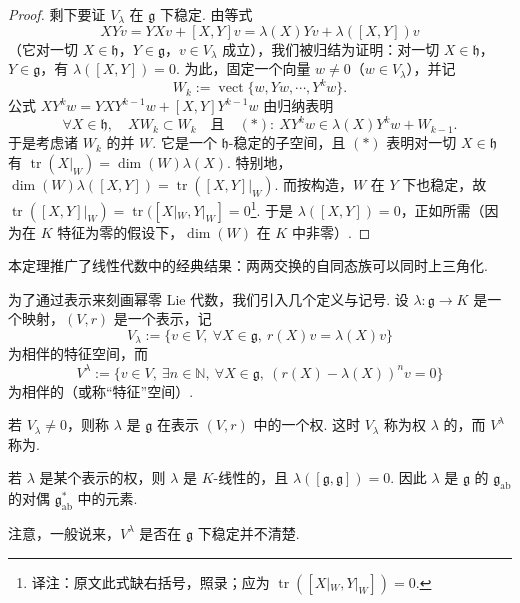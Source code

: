 \begin{numpara}[借助表示论的刻画]
\begin{proof}
剩下要证 $V_{\lambda}$ 在 $\mathfrak{g}$ 下稳定. 由等式
\[XYv = YXv + [X, Y]v = \lambda(X)Yv + \lambda([X, Y])v\]
（它对一切 $X \in \mathfrak{h}$，$Y \in \mathfrak{g}$，$v \in V_{\lambda}$ 成立），我们被归结为证明：对一切 $X \in \mathfrak{h}$，$Y \in \mathfrak{g}$，有 $\lambda([X, Y]) = 0$. 为此，固定一个向量 $w \neq 0$（$w \in V_{\lambda}$），并记
\[W_k := \operatorname{vect}\{w, Yw, \cdots, Y^k w\}.\]
公式 $XY^k w = YXY^{k-1}w + [X, Y]Y^{k-1}w$ 由归纳表明
\[\forall X \in \mathfrak{h},\quad XW_k \subset W_k\quad\text{且}\quad (\ast):\ XY^k w \in \lambda(X)Y^k w + W_{k-1}.\]
于是考虑诸 $W_k$ 的并 $W$. 它是一个 $\mathfrak{h}$-稳定的子空间，且 $(\ast)$ 表明对一切 $X \in \mathfrak{h}$ 有 $\operatorname{tr}(X|_W) = \dim(W)\lambda(X)$. 特别地，$\dim(W)\lambda([X, Y]) = \operatorname{tr}([X, Y]|_W)$. 而按构造，$W$ 在 $Y$ 下也稳定，故 $\operatorname{tr}([X, Y]|_W) = \operatorname{tr}([X|_W, Y|_W] = 0$\footnote{译注：原文此式缺右括号，照录；应为 $\operatorname{tr}([X|_W, Y|_W]) = 0$.}. 于是 $\lambda([X, Y]) = 0$，正如所需（因为在 $K$ 特征为零的假设下，$\dim(W)$ 在 $K$ 中非零）.
\end{proof}
\begin{remark*}
本定理推广了线性代数中的经典结果：两两交换的自同态族可以同时上三角化.
\end{remark*}
为了通过表示来刻画幂零 Lie 代数，我们引入几个定义与记号. 设 $\lambda : \mathfrak{g} \longrightarrow K$ 是一个映射，$(V, r)$ 是一个表示，记
\[V_{\lambda} := \{v \in V,\ \forall X \in \mathfrak{g},\ r(X)v = \lambda(X)v\}\]
为相伴的特征空间，而
\[V^{\lambda} := \{v \in V,\ \exists n \in \mathbb{N},\ \forall X \in \mathfrak{g},\ (r(X) - \lambda(X))^n v = 0\}\]
为相伴的（或称``特征''空间）.
\begin{definition*}
若 $V_{\lambda} \neq 0$，则称 $\lambda$ 是 $\mathfrak{g}$ 在表示 $(V, r)$ 中的一个权. 这时 $V_{\lambda}$ 称为权 $\lambda$ 的，而 $V^{\lambda}$ 称为.
\end{definition*}
\begin{exercise*}
若 $\lambda$ 是某个表示的权，则 $\lambda$ 是 $K$-线性的，且 $\lambda([\mathfrak{g}, \mathfrak{g}]) = 0$. 因此 $\lambda$ 是 $\mathfrak{g}$ 的 $\mathfrak{g}_{\mathrm{ab}}$ 的对偶 $\mathfrak{g}^{*}_{\mathrm{ab}}$ 中的元素.
\end{exercise*}
注意，一般说来，$V^{\lambda}$ 是否在 $\mathfrak{g}$ 下稳定并不清楚.

\end{numpara}
